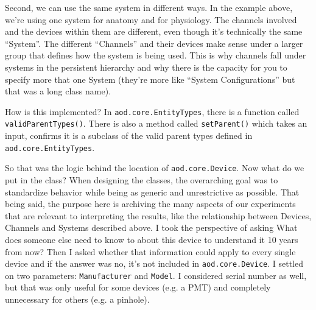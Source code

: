 \documentclass[10pt]{exam}
\newcommand\aodparam[1]{\textcolor{codepurple}{\texttt{#1}}}
\newcommand\aodclass[1]{\textcolor{codeblue}{\texttt{#1}}}
\newcommand\aodfcn[1]{\textcolor{darkteal}{\texttt{#1}}}
\begin{document}
		Second, we can use the same system in different ways. In the example above, we're using one system for anatomy and for physiology. The channels involved and the devices within them are different, even though it's technically the same ``System''. The different ``Channels'' and their devices make sense under a larger group that defines how the system is being used. This is why channels fall under systems in the persistent hierarchy and why there is the capacity for you to specify more that one System (they're more like ``System Configurations'' but that was a long class name).  
		
		How is this implemented? In \aodclass{aod.core.EntityTypes}, there is a function called \aodfcn{validParentTypes()}. 
		There is also a method called \aodfcn{setParent()} which takes an input, confirms it is a subclass of the valid parent types defined in \aodclass{aod.core.EntityTypes}.
		
		So that was the logic behind the location of \aodclass{aod.core.Device}. Now what do we put in the class? When designing the classes, the overarching goal was to standardize behavior while being as generic and unrestrictive as possible. 
		That being said, the purpose here is archiving the many aspects of our experiments that are relevant to interpreting the results, like the relationship between Devices, Channels and Systems described above. I took the perspective of asking What does someone else need to know to about this device to understand it 10 years from now? Then I asked whether that information could apply to every single device and if the answer was no, it's not included in \aodclass{aod.core.Device}. I settled on two parameters: \aodparam{Manufacturer} and \aodparam{Model}. I considered serial number as well, but that was only useful for some devices (e.g. a PMT) and completely unnecessary for others (e.g. a pinhole).
\end{document}
